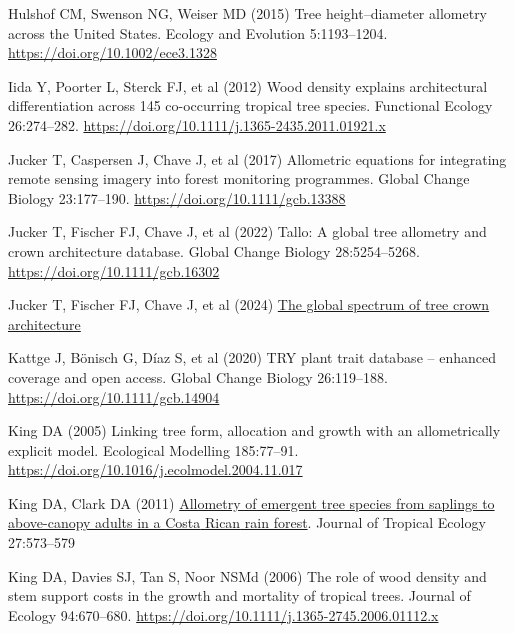 \documentclass[
  12pt,
  letterpaper,
  DIV=11,
  numbers=noendperiod]{scrartcl}
\newlength{\cslhangindent}
\newlength{\cslentryspacingunit} %
\newenvironment{CSLReferences}[2] %
 {%
  \setlength{\parindent}{0pt}
  \ifodd #1
  \let\oldpar\par
  \def\par{\hangindent=\cslhangindent\oldpar}
  \fi
  \setlength{\parskip}{#2\cslentryspacingunit}
 }%
 {}
\begin{document}
\begin{CSLReferences}{1}{0}
\leavevmode{}%
Hulshof CM, Swenson NG, Weiser MD (2015) Tree height--diameter allometry
across the {United} {States}. Ecology and Evolution 5:1193--1204.
\url{https://doi.org/10.1002/ece3.1328}

\leavevmode{}%
Iida Y, Poorter L, Sterck FJ, et al (2012) Wood density explains
architectural differentiation across 145 co-occurring tropical tree
species. Functional Ecology 26:274--282.
\url{https://doi.org/10.1111/j.1365-2435.2011.01921.x}

\leavevmode{}%
Jucker T, Caspersen J, Chave J, et al (2017) Allometric equations for
integrating remote sensing imagery into forest monitoring programmes.
Global Change Biology 23:177--190.
\url{https://doi.org/10.1111/gcb.13388}

\leavevmode{}%
Jucker T, Fischer FJ, Chave J, et al (2022) Tallo: {A} global tree
allometry and crown architecture database. Global Change Biology
28:5254--5268. \url{https://doi.org/10.1111/gcb.16302}

\leavevmode{}%
Jucker T, Fischer FJ, Chave J, et al (2024)
\href{https://doi.org/10.1101/2024.09.14.613032}{The global spectrum of
tree crown architecture}

\leavevmode{}%
Kattge J, Bönisch G, Díaz S, et al (2020) {TRY} plant trait database --
enhanced coverage and open access. Global Change Biology 26:119--188.
\url{https://doi.org/10.1111/gcb.14904}

\leavevmode{}%
King DA (2005) Linking tree form, allocation and growth with an
allometrically explicit model. Ecological Modelling 185:77--91.
\url{https://doi.org/10.1016/j.ecolmodel.2004.11.017}

\leavevmode{}%
King DA, Clark DA (2011)
\href{https://www.jstor.org/stable/23012404}{Allometry of emergent tree
species from saplings to above-canopy adults in a {Costa} {Rican} rain
forest}. Journal of Tropical Ecology 27:573--579

\leavevmode{}%
King DA, Davies SJ, Tan S, Noor NSMd (2006) The role of wood density and
stem support costs in the growth and mortality of tropical trees.
Journal of Ecology 94:670--680.
\url{https://doi.org/10.1111/j.1365-2745.2006.01112.x}


\end{CSLReferences}
\end{document}
